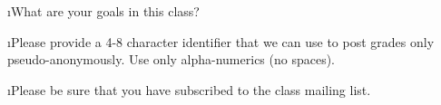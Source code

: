 \documentclass[fleqn]{article}
\begin{document}
% 

\i What are your goals in this class?


\i Please provide a 4-8 character identifier that we can use to post
grades only pseudo-anonymously.  Use only alpha-numerics (no spaces).


\i Please be sure that you have subscribed to the class mailing list.

\ene
\end{document}
